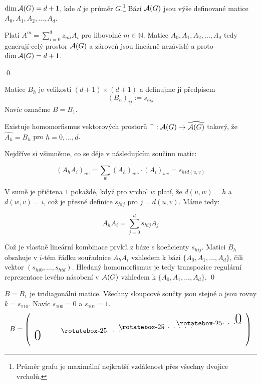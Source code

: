 \vt $\dim \mathcal{A}(G) = d+1$, kde $d$ je průměr $G$.\footnote{Průměr grafu je maximální nejkratší vzdálenost přes všechny dvojice vrcholů.} Bází $\mathcal{A}(G)$ jsou výše definované matice $A_0, A_1, A_2, \dots, A_d$. 

\dk Platí $A^m = \sum_{i=0}^d z_{mi}A_i$ pro libovolné $m\in \mathbb{N}$. Matice $A_0, A_1, A_2, \dots, A_d$ tedy generují celý prostor $\mathcal{A}(G)$ a zároveň jsou lineárně nezávislé a proto $\dim \mathcal{A}(G) = d+1$.
 
\qed



\df Matice $B_h$ je velikosti $(d+1)\times (d+1)$ a definujme ji předpisem
$$
	(B_h)_{ij} := s_{hij}
$$
Navíc označme $B=B_1$.

\lm Existuje homomorfismus vektorových prostorů $\widehat{~~}: \mathcal{A}(G) \to \widehat{\mathcal{A}(G)}$ takový, že $\widehat{A_h} = B_h$ pro $h=0, \dots, d$.

\dk %
Nejdříve si všimněme, co se děje v následujícím součinu matic:

$$
	(A_hA_i)_{uv} = \sum_w(A_h)_{uw} \cdot (A_i)_{wv} = s_{hid(u,v)}
$$

V sumě je přičtena $1$ pokaždé, když pro vrchol $w$ platí, že $d(u,w)=h$ a $d(w,v) = i$, což je přesně definice $s_{hij}$ pro $j = d(u,v)$. Máme tedy:

$$
	A_hA_i = \sum_{j=0}^d s_{hij} A_j
$$

Což je vlastně lineární kombinace prvků z báze s koeficienty $s_{hij}$.
Matici $B_h$ obsahuje v $i$-tém řádku souřadnice $A_hA_i$ vzhledem k bázi $\{A_0, A_1, \dots, A_d\}$, čili vektor $(s_{hi0}, \dots, s_{hid})$. Hledaný homomorfismus je tedy transpozice regulární reprezentace levého násobení v $\mathcal{A}(G)$ vzhledem k $\{A_0, A_1, \dots, A_d\}$.
\qed



\lm $B=B_1$ je tridiagonální matice. Všechny sloupcové součty jsou stejné a jsou rovny $k=s_{110}$. Navíc $s_{100}=0$ a $s_{101}=1$.
$$
B= \left(\begin{matrix}
& & & & & & & & \bigzero & \\
& & & & & & & & & \\
& \bigzero & & & & {\smash{\raisebox{.75\normalbaselineskip}{\diagdots{9em}{.5em}}}} & {\smash{\raisebox{1.2\normalbaselineskip}{\diagdots{6.5em}{.5em}}}} & \\
& & & & {\smash{\raisebox{1.3\normalbaselineskip}{\diagdots{6.5em}{.5em}}}} & & \\
\end{matrix}\right)$$

